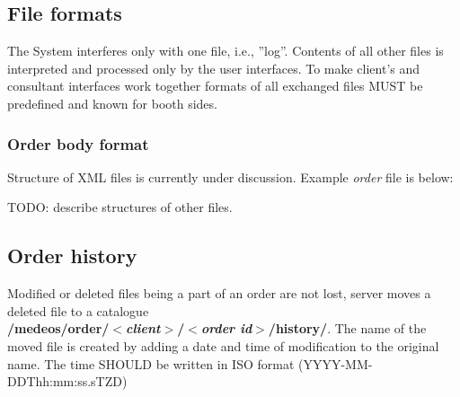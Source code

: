 \documentclass[a4paper]{article}
\begin{document}
\subsection{File formats}
\label{sec:formaty}

The System interferes only with one file, i.e., ''log''. Contents of all other files
is interpreted and processed only by the user interfaces. To make client's and consultant
interfaces work together formats of all exchanged files MUST be predefined and known
for booth sides.

\subsubsection{Order body format}

Structure of XML files is currently under discussion. Example \emph{order} file is below:



TODO: describe structures of other files.

\subsection{Order history}
\label{sec:hist}

Modified or deleted files being a part of an 
order are not lost, server moves a deleted file to a catalogue\\
\textbf{/medeos/order/$<$\textit{client}$>$/$<$\textit{order id}$>$/history/}.
The name of the moved file is created by adding a date and time of modification to the
original name. The time SHOULD be written in ISO format (YYYY-MM-DDThh:mm:ss.sTZD)
\end{document}
